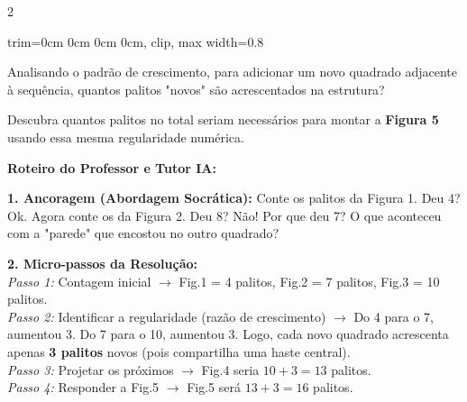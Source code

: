 \begin{multicols*}{2}
\begin{enunciadoLiteral}
\begin{center}
\begin{adjustbox}{trim=0cm 0cm 0cm 0cm, clip, max width=0.8\linewidth}
\end{adjustbox}
\end{center}

Analisando o padrão de crescimento, para adicionar um novo quadrado adjacente à sequência, quantos palitos "novos" são acrescentados na estrutura? 

Descubra quantos palitos no total seriam necessários para montar a \textbf{Figura 5} usando essa mesma regularidade numérica.
\end{enunciadoLiteral}

\ifgabarito
    \begin{tcolorbox}[colback=CorTitUm!5, colframe=CorTitUm, boxrule=1pt, arc=4pt, left=6pt, right=6pt, top=6pt, bottom=6pt]
    \small\textbf{\textcolor{CorTitUm}{Roteiro do Professor e Tutor IA:}}\par\vspace{0.1cm}
    \color{CinzaEscuro}
    \textbf{1. Ancoragem (Abordagem Socrática):} Conte os palitos da Figura 1. Deu 4? Ok. Agora conte os da Figura 2. Deu 8? Não! Por que deu 7? O que aconteceu com a "parede" que encostou no outro quadrado?\par\vspace{0.1cm}
    
    \textbf{2. Micro-passos da Resolução:}\\
    \textit{Passo 1:} Contagem inicial $\rightarrow$ Fig.1 = 4 palitos, Fig.2 = 7 palitos, Fig.3 = 10 palitos.\\
    \textit{Passo 2:} Identificar a regularidade (razão de crescimento) $\rightarrow$ Do 4 para o 7, aumentou 3. Do 7 para o 10, aumentou 3. Logo, cada novo quadrado acrescenta apenas \textbf{3 palitos} novos (pois compartilha uma haste central).\\
    \textit{Passo 3:} Projetar os próximos $\rightarrow$ Fig.4 seria $10 + 3 = 13$ palitos.\\
    \textit{Passo 4:} Responder a Fig.5 $\rightarrow$ Fig.5 será $13 + 3 = 16$ palitos.\par\vspace{0.1cm}
    

\end{tcolorbox}
\end{multicols*}
